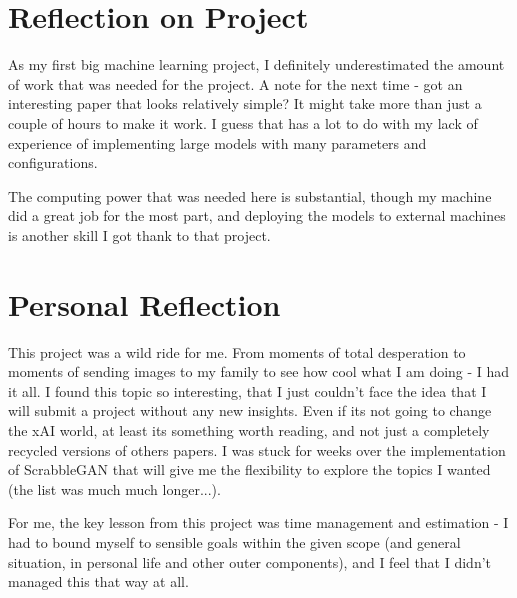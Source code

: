 
\section{Reflection on Project}
As my first big machine learning project, I definitely underestimated the amount of work that was needed for the project. A note for the next time - got an interesting paper that looks relatively simple? It might take more than just a couple of  hours to make it work. I guess that has a lot to do with my lack of experience of implementing large models with many parameters and configurations.

The computing power that was needed here is substantial, though my machine did a great job for the most part, and deploying the models to external machines is another skill I got thank to that project.


\section{Personal Reflection}
This project was a wild ride for me. From moments of total desperation to moments of sending images to my family to see how cool what I am doing - I had it all. 
I found this topic so interesting, that I just couldn't face the idea that I will submit a project without any new insights. Even if its not going to change the xAI world, at least its something worth reading, and not just a completely recycled versions of others papers.
I was stuck for weeks over the implementation of ScrabbleGAN that will give me the flexibility to explore the topics I wanted (the list was much much longer...).

For me, the key lesson from this project was time management and estimation - I had to bound myself to sensible goals within the given scope (and general situation, in personal life and other outer components), and I feel that I didn't managed this that way at all.